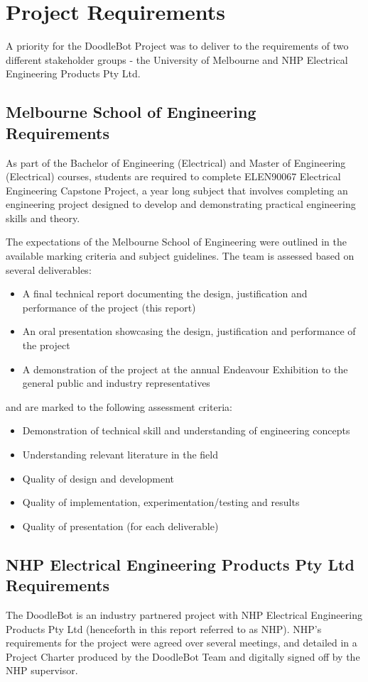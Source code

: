\section{Project Requirements}

A priority for the DoodleBot Project was to deliver to the requirements of two different stakeholder groups - the University of Melbourne and NHP Electrical Engineering Products Pty Ltd.

\subsection{Melbourne School of Engineering Requirements}
As part of the Bachelor of Engineering (Electrical) and Master of Engineering (Electrical) courses, students are required to complete ELEN90067 Electrical Engineering Capstone Project, a year long subject that involves completing an engineering project designed to develop and demonstrating practical engineering skills and theory. 

The expectations of the Melbourne School of Engineering were outlined in the available marking criteria and subject guidelines. The team is assessed based on several deliverables:
	\begin{itemize}
		\item A final technical report documenting the design, justification and performance of the project (this report)
		\item An oral presentation showcasing the design, justification and performance of the project
		\item A demonstration of the project at the annual Endeavour Exhibition to the general public and industry representatives
	\end{itemize}
and are marked to the following assessment criteria:
	\begin{itemize}
		\item Demonstration of technical skill and understanding of engineering concepts
		\item Understanding relevant literature in the field
		\item Quality of design and development
		\item Quality of implementation, experimentation/testing and results
		\item Quality of presentation (for each deliverable)
	\end{itemize}
	
\subsection{NHP Electrical Engineering Products Pty Ltd Requirements}
The DoodleBot is an industry partnered project with NHP Electrical Engineering Products Pty Ltd (henceforth in this report referred to as NHP). NHP's requirements for the project were agreed over several meetings, and detailed in a Project Charter produced by the DoodleBot Team and digitally signed off by the NHP supervisor.

